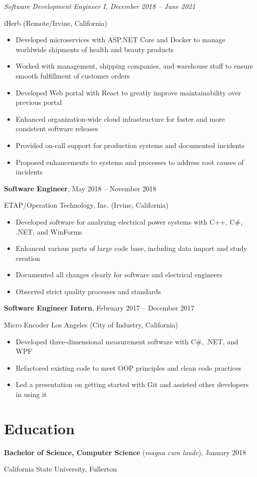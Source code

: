 \documentclass[10pt]{article}
\newcommand{\titleheader}[2]{\textbf{#1}, #2}
\newcommand{\titleextraheader}[3]{\textbf{#1} (#3), #2}
\newcommand{\secondaryheader}[1]{\hspace{2.25em} \textit{#1}}
\newcommand{\locheader}[2]{#1 (#2)}
\newcommand{\instheader}[1]{#1}
\begin{document}
	\secondaryheader{Software Development Engineer I, December 2018 -- June 2021}

	\locheader{iHerb}{Remote/Irvine, California}

	\begin{itemize}
		\item Developed microservices with ASP.NET Core and Docker to manage worldwide shipments of health and beauty products
		\item Worked with management, shipping companies, and warehouse staff to ensure smooth fulfillment of customer orders
		\item Developed Web portal with React to greatly improve maintainability over previous portal
		\item Enhanced organization-wide cloud infrastructure for faster and more consistent software releases
		\item Provided on-call support for production systems and documented incidents
		\item Proposed enhancements to systems and processes to address root causes of incidents
	\end{itemize}

	\titleheader{Software Engineer}{May 2018 -- November 2018}

	\locheader{ETAP/Operation Technology, Inc.}{Irvine, California}

	\begin{itemize}
		\item Developed software for analyzing electrical power systems with C++, C\#, .NET, and WinForms
		\item Enhanced various parts of large code base, including data import and study creation
		\item Documented all changes clearly for software and electrical engineers
		\item Observed strict quality processes and standards
	\end{itemize}

	\titleheader{Software Engineer Intern}{February 2017 -- December 2017}

	\locheader{Micro Encoder Los Angeles}{City of Industry, California}

	\begin{itemize}
		\item Developed three-dimensional measurement software with C\#, .NET, and WPF
		\item Refactored existing code to meet OOP principles and clean code practices
		\item Led a presentation on getting started with Git and assisted other developers in using it
	\end{itemize}

	\section*{Education}

	\titleextraheader{Bachelor of Science, Computer Science}{January 2018}{\textit{magna cum laude}}

	\instheader{California State University, Fullerton}
\end{document}
